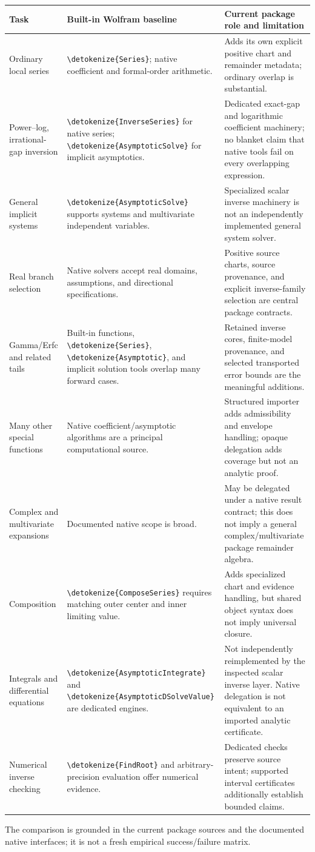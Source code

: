 \documentclass[11pt,a4paper]{article}
\newcommand{\wl}[1]{\texttt{\expandafter\nolinkurl\expandafter{\detokenize{#1}}}}
\begin{document}
\begin{longtable}{@{}p{}p{}p{}@{}}
\toprule
Task & Built-in Wolfram baseline & Current package role and limitation\\
\midrule
\endhead
Ordinary local series & \wl{Series}; native coefficient and formal-order arithmetic. & Adds its own explicit positive chart and remainder metadata; ordinary overlap is substantial.\\[5pt]
Power--log, irrational-gap inversion & \wl{InverseSeries} for native series; \wl{AsymptoticSolve} for implicit asymptotics. & Dedicated exact-gap and logarithmic coefficient machinery; no blanket claim that native tools fail on every overlapping expression.\\[5pt]
General implicit systems & \wl{AsymptoticSolve} supports systems and multivariate independent variables. & Specialized scalar inverse machinery is not an independently implemented general system solver.\\[5pt]
Real branch selection & Native solvers accept real domains, assumptions, and directional specifications. & Positive source charts, source provenance, and explicit inverse-family selection are central package contracts.\\[5pt]
Gamma/Erfc and related tails & Built-in functions, \wl{Series}, \wl{Asymptotic}, and implicit solution tools overlap many forward cases. & Retained inverse cores, finite-model provenance, and selected transported error bounds are the meaningful additions.\\[5pt]
Many other special functions & Native coefficient/asymptotic algorithms are a principal computational source. & Structured importer adds admissibility and envelope handling; opaque delegation adds coverage but not an analytic proof.\\[5pt]
Complex and multivariate expansions & Documented native scope is broad. & May be delegated under a native result contract; this does not imply a general complex/multivariate package remainder algebra.\\[5pt]
Composition & \wl{ComposeSeries} requires matching outer center and inner limiting value. & Adds specialized chart and evidence handling, but shared object syntax does not imply universal closure.\\[5pt]
Integrals and differential equations & \wl{AsymptoticIntegrate} and \wl{AsymptoticDSolveValue} are dedicated engines. & Not independently reimplemented by the inspected scalar inverse layer. Native delegation is not equivalent to an imported analytic certificate.\\[5pt]
Numerical inverse checking & \wl{FindRoot} and arbitrary-precision evaluation offer numerical evidence. & Dedicated checks preserve source intent; supported interval certificates additionally establish bounded claims.\\
\bottomrule
\end{longtable}
The comparison is grounded in the current package sources and the documented
native interfaces; it is not a fresh empirical success/failure matrix.\cite{core,native,nativedoc,special,cert,wlinverseseries,wlasymsolve,wlcompose,wlasymintegrate,wlasymdsolve}
\end{document}

